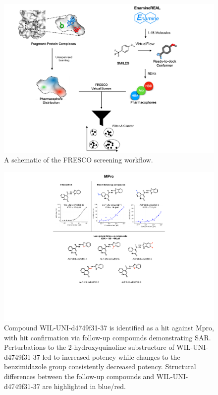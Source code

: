  \begin{figure}[th!]
    \centering
    \includegraphics[width=\linewidth]{Chapters/Fresco/Figs/flowchart_screening.pdf}
    \caption{A schematic of the FRESCO screening workflow.}
    \label{fig:screening_workflow}
\end{figure}

\begin{figure}[h!]
    \centering
    \includegraphics[width=\linewidth]{Chapters/Fresco/Figs/mpro_hit_IC50.pdf}
    \caption{Compound WIL-UNI-d4749f31-37 is identified as a hit against Mpro, with hit confirmation via follow-up compounds demonstrating SAR. Perturbations to the 2-hydroxyquinoline substructure of WIL-UNI-d4749f31-37 led to increased potency while changes to the benzimidazole group consistently decreased potency. Structural differences between the follow-up compounds and WIL-UNI-d4749f31-37 are highlighted in blue/red.}
    \label{fig:mpro_hit}
\end{figure}

